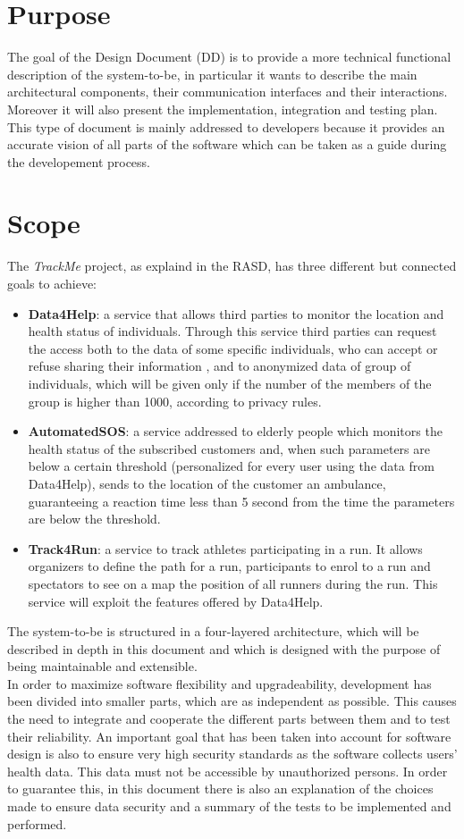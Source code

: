 \section{Purpose}
The goal of the Design Document (DD) is to provide a more technical functional description of the system-to-be, in particular it wants to describe the main architectural components, their communication interfaces and their interactions. Moreover it will also present the implementation, integration and testing plan.
This type of document is mainly addressed to developers because it provides an accurate vision of all parts of the software which can be taken as a guide during the developement process.
\section{Scope}
The \textit{TrackMe} project, as explaind in the RASD, has three different but connected goals to achieve:
\begin{itemize}
  \item \textbf{Data4Help}: a service that allows third parties to monitor the location and health status of individuals. Through this service third parties can request the access both to the data of some specific individuals, who can accept or refuse sharing their information , and to anonymized data of group of individuals, which will be given only if the number of the members of the group is higher than 1000, according to privacy rules.
  \item \textbf{AutomatedSOS}: a service addressed to elderly people which monitors the health status of the subscribed customers and, when such parameters are below a certain threshold (personalized for every user using the data from Data4Help), sends to the location of the customer an ambulance, guaranteeing a reaction time less than 5 second from the time the parameters are below the threshold.
  \item \textbf{Track4Run}: a service to track athletes participating in a run. It allows organizers to define the path for a run, participants to enrol to a run and spectators to see on a map the position of all runners during the run. This service will exploit the features offered by Data4Help.
\end{itemize}
The system-to-be is structured in a four-layered architecture, which will be described in depth in this document and which is designed with the purpose of being maintainable and extensible.\\
In order to maximize software flexibility and upgradeability, development has been divided into smaller parts, which are as independent as possible.
This causes the need to integrate and cooperate the different parts between them and to test their reliability.
An important goal that has been taken into account for software design is also to ensure very high security standards as the software collects users' health data. This data must not be accessible by unauthorized persons.
In order to guarantee this, in this document there is also an explanation of the choices made to ensure data security and a summary of the tests to be implemented and performed.

